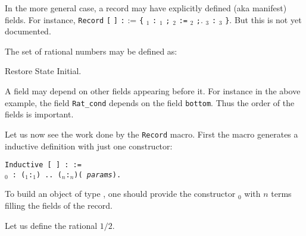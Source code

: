 In the more general case, a record may have explicitly defined (aka
manifest) fields. For instance, {\tt Record} {\ident} {\tt [}
{\params} {\tt ]} \texttt{:} {\sort} := \verb+{+ {\ident$_1$}
\texttt{:} {\type$_1$} \verb+;+ {\ident$_2$} \texttt{:=} {\term$_2$} \verb+;+.
{\ident$_3$} \texttt{:} {\type$_3$} \verb+}+. But this is not yet
documented.


\Example
The set of rational numbers may be defined as:
\begin{coq_eval}
Restore State Initial.
\end{coq_eval}

A field may depend on other fields appearing before it. 
For instance in the above example, the field
\verb+Rat_cond+ depends on the field \verb+bottom+. Thus the order of
the fields is important.

Let us now see the work done by the {\tt Record} macro.
First the macro generates a inductive definition
with just one constructor:

\medskip
\noindent
{\tt Inductive {\ident} [ {\params} ] : {\sort} := \\
\mbox{}\hspace{0.4cm} {\ident$_0$} : ({\ident$_1$}:{\term$_1$}) .. 
({\ident$_n$}:{\term$_n$})({\ident} {\rm\sl params}).}
\medskip

To build an object of type {\ident}, one should provide the
constructor {\ident$_0$} with $n$ terms filling the fields of
the record.

Let us define the rational $1/2$.

